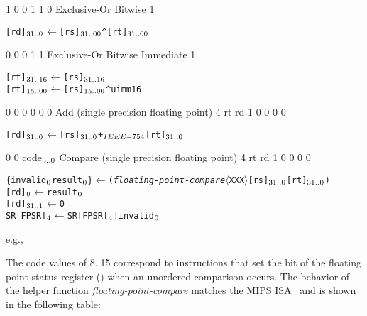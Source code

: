    {1 0 0 1 1 0}    {Exclusive-Or Bitwise}                           {1}    {\MIPSTag}
\begin{alltt}
        [rd]\({\sb{31..0}}\) \(\leftarrow\) [rs]\({\sb{31..00}}\) ^ [rt]\({\sb{31..00}}\)
\end{alltt}\rawInstrEnd

    {0 0 0 1 1}    {Exclusive-Or Bitwise Immediate}        {1}    {\MIPSTag}
\begin{alltt}
        [rt]\({\sb{31..16}}\) \(\leftarrow\) [rs]\({\sb{31..16}}\)
        [rt]\({\sb{15..00}}\) \(\leftarrow\) [rs]\({\sb{15..00}}\) ^ uimm16
\end{alltt}\rawInstrEnd

 {0 0 0 0 0 0} {Add (single precision floating point)} {4} {\RawTag} {rt} {rd} {1 0 0 0 0}
\begin{alltt}
        [rd]\({\sb{31..0}}\) \(\leftarrow\) [rs]\({\sb{31..0}}\) +\(\sb{IEEE-754}\) [rt]\({\sb{31..0}}\)
\end{alltt}\rawInstrEnd

 {0 0 code\({\sb{3..0}}\)} {Compare (single precision floating point)} {4} {\RawTag} {rt} {rd} {1 0 0 0 0}
\begin{alltt}
        \{invalid\({\sb{0}}\) result\({\sb{0}}\)\}  \hspace{.5mm} \(\leftarrow\) ({\em{floating-point-compare}} \(\langle\)XXX\(\rangle\) [rs]\({\sb{31..0}}\) [rt]\({\sb{31..0}}\))
        [rd]\({\sb{0}}\)                \(\leftarrow\) result\({\sb{0}}\)
        [rd]\({\sb{31..1}}\)   \hspace{1mm}          \(\leftarrow\) 0
        SR[FPSR]\({\sb{4}}\)            \(\leftarrow\) SR[FPSR]\({\sb{4}}\) | invalid\({\sb{0}}\)
\end{alltt}

e.g., 


\vspace{5mm}
The code values of 8..15 correspond to instructions that set the  bit
of the floating point status register () when an unordered comparison occurs.
The behavior of the helper function {\em{floating-point-compare}} matches the MIPS ISA~\cite{MIPS_R4000_Users_Manual}
and is shown in the following table:
\vspace{5mm}

